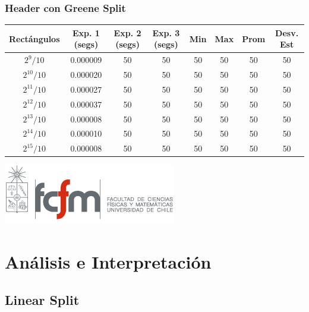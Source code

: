 \documentclass[letterpaper,10pt]{article}
\begin{document}
	\subsubsection{Header con Greene Split}
	\begin{center}

		\begin{tabular}{|c|c|c|c|c|c|c|c|}
			\hline
			Rectángulos	& Exp. 1 (segs) & Exp. 2 (segs) & Exp. 3 (segs) & Min & Max & Prom & Desv. Est\\
			\hline
			$2^{9}/10$ 	& 0.000009 & 50 	& 50 	& 50 	& 50 	& 50 	& 50 \\
			\hline
			$2^{10}/10$ 	& 0.000020 & 50 	& 50 	& 50 	& 50 	& 50 	& 50 \\
			\hline
			$2^{11}/10$ 	& 0.000027 & 50 	& 50 	& 50 	& 50 	& 50 	& 50 \\
			\hline
			$2^{12}/10$ 	& 0.000037 & 50 	& 50 	& 50 	& 50 	& 50 	& 50 \\
			\hline
			$2^{13}/10$ 	& 0.000008 & 50 	& 50 	& 50 	& 50 	& 50 	& 50 \\
			\hline
			$2^{14}/10$ 	& 0.000010 & 50 	& 50 	& 50 	& 50 	& 50 	& 50 \\
			\hline
			$2^{15}/10$ 	& 0.000008 & 50 	& 50 	& 50 	& 50 	& 50 	& 50 \\
			\hline
		\end{tabular}

		\includegraphics{logoFCFM.png}
	\end{center}

	\newpage

	\section{Análisis e Interpretación}

	\subsection{Linear Split}
\end{document}
